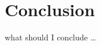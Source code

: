 \section{Conclusion}
%
\begin{conclusion}
  \begin{tbox}[.7]
    \item what should I conclude \ldots
  \end{tbox}
\end{conclusion}
%
